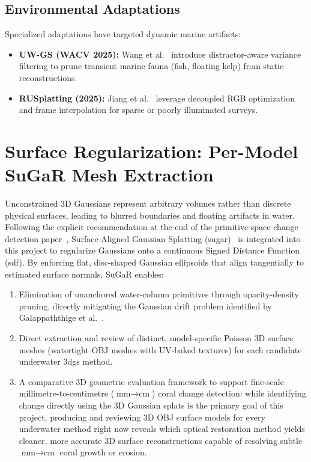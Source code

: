 \subsection{Environmental Adaptations}
Specialized adaptations have targeted dynamic marine artifacts:
\begin{itemize}
    \item \textbf{UW-GS (WACV 2025):} Wang et al.~\cite{10943785} introduce distractor-aware variance filtering to prune transient marine fauna (fish, floating kelp) from static reconstructions.
    \item \textbf{RUSplatting (2025):} Jiang et al.~\cite{jiang2025rusplattingrobust3dgaussian} leverage decoupled RGB optimization and frame interpolation for sparse or poorly illuminated surveys.
\end{itemize}

\section{Surface Regularization: Per-Model SuGaR Mesh Extraction}
\label{sec:lit_sugar}
Unconstrained 3D Gaussians represent arbitrary volumes rather than discrete physical surfaces, leading to blurred boundaries and floating artifacts in water. Following the explicit recommendation at the end of the primitive-space change detection paper~\cite{galappaththige2026pixelsprimitivesscenechange}, Surface-Aligned Gaussian Splatting (\gls{sugar})~\cite{guedon2024sugar} is integrated into this project to regularize Gaussians onto a continuous Signed Distance Function (\gls{sdf}). By enforcing flat, disc-shaped Gaussian ellipsoids that align tangentially to estimated surface normals, SuGaR enables:
\begin{enumerate}
    \item Elimination of unanchored water-column primitives through opacity-density pruning, directly mitigating the Gaussian drift problem identified by Galappaththige et al.~\cite{galappaththige2026pixelsprimitivesscenechange}.
    \item Direct extraction and review of distinct, model-specific Poisson 3D surface meshes (watertight OBJ meshes with UV-baked textures) for each candidate underwater \gls{3dgs} method.
    \item A comparative 3D geometric evaluation framework to support fine-scale millimetre-to-centimetre ($\text{mm} \to \text{cm}$) coral change detection: while identifying change directly using the 3D Gaussian splats is the primary goal of this project, producing and reviewing 3D OBJ surface models for every underwater method right now reveals which optical restoration method yields cleaner, more accurate 3D surface reconstructions capable of resolving subtle $\text{mm} \to \text{cm}$ coral growth or erosion.
\end{enumerate}

